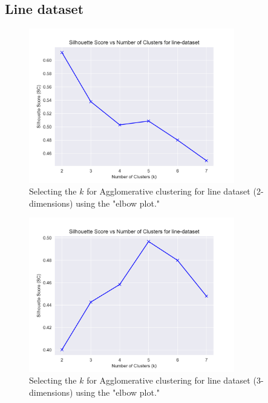 \subsection{Line dataset}
\begin{figure}[H]
  \includegraphics[width=0.8\textwidth]{Appendix/parameter-selection/line-dataset_agglomerative_optimal_cluster_2.png}
  \caption{Selecting the $k$ for Agglomerative clustering for line dataset (2-dimensions) using the "elbow plot."}
  \label{hyperparameters:agglomerative-line-dataset-2d}
\end{figure}
\begin{figure}[H]
  \includegraphics[width=0.8\textwidth]{Appendix/parameter-selection/line-dataset_agglomerative_optimal_cluster_3.png}
  \caption{Selecting the $k$ for Agglomerative clustering for line dataset (3-dimensions) using the "elbow plot."}
  \label{hyperparameters:agglomerative-line-dataset-3d}
\end{figure}
\newpage
